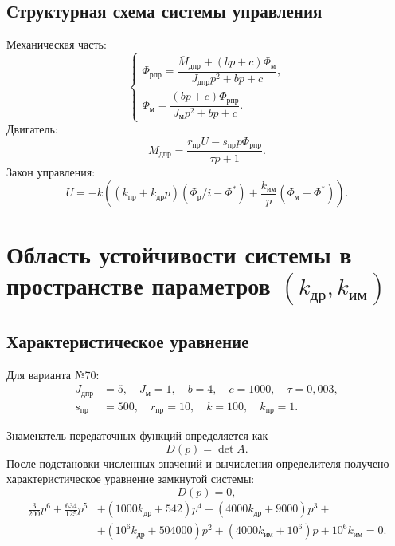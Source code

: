 \documentclass[a4paper, 14pt]{extarticle}
\begin{document}
\subsection{Структурная схема системы управления}

Механическая часть:
\[
	\begin{cases}
		\Phi_{\text{рпр}}=\dfrac{\overline{M}_{\text{дпр}}+(bp+c)\Phi_\text{м}}
		                  {J_{\text{дпр}}p^2+bp+c}, \\
		\Phi_\text{м}=\dfrac{(bp+c)\Phi_{\text{рпр}}}{J_\text{м}p^2+bp+c}.
	\end{cases}
\]
Двигатель:
\[
	\overline{M}_{\text{дпр}}=\dfrac{r_{\text{пр}}U-s_{\text{пр}}p\Phi_{\text{рпр}}}{\tau p+1}.
\]
Закон управления:
\[
	U=-k\!\left((k_\text{пр}+k_\text{др}p)(\Phi_\text{р}/i-\Phi^*)+\frac{k_\text{им}}{p}(\Phi_\text{м}-\Phi^*)\right).
\]


\newpage

\section[Область устойчивости системы в пространстве параметров]{Область устойчивости системы в пространстве параметров $(k_{\text{др}},k_{\text{им}})$}

\subsection{Характеристическое уравнение}

Для варианта №70:
\[
	\begin{aligned}
		J_{\text{дпр}} & = 5, \quad J_\text{м} = 1, \quad b = 4, \quad c = 1000, \quad \tau = 0{,}003, \\
		s_{\text{пр}}  & = 500, \quad r_{\text{пр}} = 10, \quad k = 100, \quad k_\text{пр} = 1.
	\end{aligned}
\]

Знаменатель передаточных функций определяется как
\[
	D(p)=\det A.
\]
После подстановки численных значений и вычисления определителя получено характеристическое уравнение замкнутой системы:
\[
	D(p)=0,
\]
\[
	\begin{split}
		\frac{3}{200}p^6 + \frac{634}{125}p^5 & + (1000k_\text{др}+542)p^4 + (4000k_\text{др}+9000)p^3 +                       \\
		                                      & + (10^6k_\text{др}+504000)p^2 + (4000k_\text{им}+10^6)p + 10^6k_\text{им} = 0.
	\end{split}
\]
\end{document}
